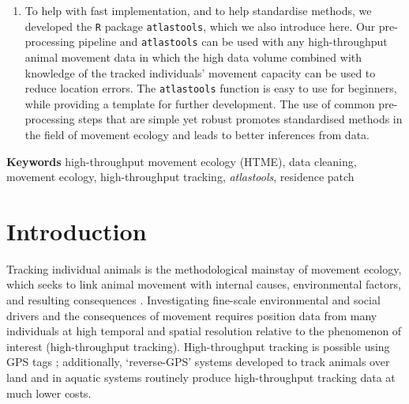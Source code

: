 \documentclass[10pt,paper=a4,headings=standardclasses
]{scrartcl}
\begin{document}
\begin{enumerate}
    \item To help with fast implementation, and to help standardise methods, we developed the \texttt{R} package \texttt{atlastools}, which we also introduce here.
    Our pre-processing pipeline and \texttt{atlastools} can be used with any high-throughput animal movement data in which the high data volume combined with knowledge of the tracked individuals’ movement capacity can be used to reduce location errors.
    The \texttt{atlastools} function is easy to use for beginners, while providing a template for further development.
    The use of common pre-processing steps that are simple yet robust promotes standardised methods in the field of movement ecology and leads to better inferences from data.
\end{enumerate}

\textbf{Keywords} high-throughput movement ecology (HTME), data cleaning, movement ecology, high-throughput tracking, \textit{atlastools}, residence patch

\linenumbers

\section{Introduction}

Tracking individual animals is the methodological mainstay of movement ecology, which seeks to link animal movement with internal causes, environmental factors, and resulting consequences \citep{nathan2008a, holyoak2008}. 
Investigating fine-scale environmental and social drivers and the consequences of movement requires position data from many individuals at high temporal and spatial resolution relative to the phenomenon of interest (high-throughput tracking).
High-throughput tracking is possible using GPS tags \citep[see recent examples in][]{strandburg-peshkin2015, papageorgiou2019, harel2016}; additionally, ‘reverse-GPS’ systems developed to track animals over land \citep{toledo2014, weiser2016, toledo2016,toledo2020, maccurdy2009, maccurdy2019} and in aquatic systems \citep{hussey2015, baktoft2019, baktoft2017,jung2015, aspillaga2021} routinely produce high-throughput tracking data at much lower costs.
\end{document}
